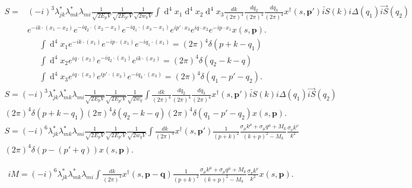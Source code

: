 \begin{align}
S=&(-i)^{3}\lambda^*_{jk}\lambda^*_{mk}\lambda_{mi}\frac{1}{\sqrt{2E_p V}}\frac{1}{\sqrt{2E_{p'} V}}\frac{1}{\sqrt{2w_k V}}\int\operatorname{d}^{4}x_{1}\operatorname{d}^{4}x_{2}
\operatorname{d}^{4}x_{3} \frac{dk}{(2\pi)^4}\frac{dq_{2}}{(2\pi)^4}\frac{dq_{3}}{(2\pi)^4}x^\dagger(s,\boldsymbol{p'})\overleftarrow{iS}(k)i\Delta(q_{1})\overrightarrow{iS}(q_{2})\nonumber\\ 
&e^{-ik\cdot (x_{1}-x_{2})}e^{-iq_{2}\cdot (x_{2}-x_{3})}e^{-iq_{1}\cdot  (x_{3}-x_{1})}e^{ip'\cdot x_{3}}e^{i q\cdot x_{2}}e^{-i p\cdot x_{1}}x(s,\boldsymbol{p}).
\end{align}
\begin{align}
\int\operatorname{d}^{4}x_{1}e^{-ik\cdot (x_{1})}e^{-ip\cdot (x_{1})}e^{-iq_{1}\cdot (x_{1})}=(2\pi)^4\delta(p+k-q_{1})\\ 
\int\operatorname{d}^{4}x_{2}e^{iq\cdot (x_{2})}e^{-iq_{2}\cdot (x_{2})}e^{ik\cdot (x_{2})}=(2\pi)^4\delta(q_{2}-k-q)\\
\int\operatorname{d}^{4}x_{3}e^{iq\cdot (x_{3})}e^{ip'\cdot (x_{3})}e^{-iq_{3}\cdot (x_{3})}=(2\pi)^4\delta(q_{1}-p'-q_{2}).
\end{align}
\begin{align}
S={(-i)^3}\lambda^*_{jk}\lambda^*_{mk}\lambda_{mi}\frac{1}{\sqrt{2E_p V}}\frac{1}{\sqrt{2E_{p'} V}}\frac{1}{\sqrt{2w_q}}\int \frac{dk}{(2\pi)^4}\frac{dq_{2}}{(2\pi)^4}\frac{dq_{3}}{(2\pi)^4}x^\dagger(s,\boldsymbol{p'})\overleftarrow{iS}(k)i\Delta(q_{1})\overrightarrow{iS}(q_{2})\nonumber\\(2\pi)^4\delta(p+k-q_{1})(2\pi)^4\delta(q_{2}-k-q)(2\pi)^4\delta(q_{1}-p'-q_{2})x(s,\boldsymbol{p}).
\end{align}
  \begin{align}
S={(-i)^6}\lambda^*_{jk}\lambda^*_{mk}\lambda_{mi}\frac{1}{\sqrt{2E_p V}}\frac{1}{\sqrt{2E_{p'} V}}\frac{1}{\sqrt{2w_q V}}\int \frac{dk}{(2\pi)^4}x^\dagger(s,\boldsymbol{p'})\frac{1}{(p+k)^2}\frac{\sigma_{\mu}k^{\mu}+\sigma_{\mu}q^{\mu}+M_{k}}{(k+p)^2-M_k}\frac{\sigma_{\nu}k^{\nu}}{k^2}\nonumber\\(2\pi)^4\delta(p-(p'+q))
x(s,\boldsymbol{p}).
\end{align}

\begin{align}
iM={(-i)^6}\lambda^*_{jk}\lambda^*_{mk}\lambda_{mi}\int \frac{dk}{(2\pi)^4}x^\dagger(s,\boldsymbol{p-q})\frac{1}{(p+k)^2}\frac{\sigma_{\mu}k^{\mu}+\sigma_{\mu}q^{\mu}+M_{k}}{(k+p)^2-M_k}\frac{\sigma_{\nu}k^{\nu}}{k^2}
x(s,\boldsymbol{p}).
\end{align}
 
